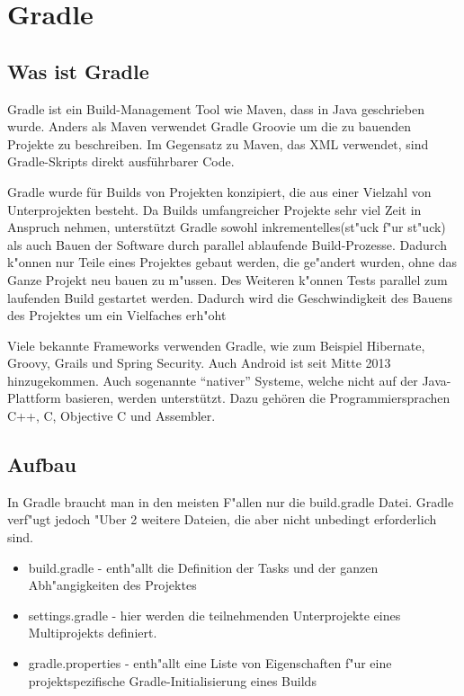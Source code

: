 \section{Gradle}

\subsection{Was ist Gradle}
Gradle ist ein Build-Management Tool wie Maven, dass in Java geschrieben wurde. Anders als Maven verwendet Gradle Groovie um die zu bauenden Projekte zu beschreiben. Im Gegensatz zu Maven, das XML verwendet, sind Gradle-Skripts direkt ausführbarer Code.

Gradle wurde für Builds von Projekten konzipiert, die aus einer Vielzahl von Unterprojekten besteht.
Da Builds umfangreicher Projekte sehr viel Zeit in Anspruch nehmen, unterstützt Gradle sowohl inkrementelles(st"uck f"ur st"uck) als auch Bauen der Software durch parallel ablaufende Build-Prozesse. Dadurch k"onnen nur Teile eines Projektes gebaut werden, die ge"andert wurden, ohne das Ganze Projekt neu bauen zu m"ussen. Des Weiteren k"onnen Tests parallel zum laufenden Build gestartet werden. Dadurch wird die Geschwindigkeit des Bauens des Projektes um ein Vielfaches erh"oht

Viele bekannte Frameworks verwenden Gradle, wie zum Beispiel Hibernate, Groovy, Grails und Spring Security. Auch Android ist seit Mitte 2013 hinzugekommen. Auch sogenannte ``nativer'' Systeme, welche nicht auf der Java-Plattform basieren, werden unterstützt. Dazu gehören die Programmiersprachen C++, C, Objective C und Assembler.

\subsection{Aufbau}
In Gradle braucht man in den meisten F"allen nur die build.gradle Datei. Gradle verf"ugt jedoch "Uber 2 weitere Dateien, die aber nicht unbedingt erforderlich sind.
\begin{itemize}
\item build.gradle - enth"allt die Definition der Tasks und der ganzen Abh"angigkeiten des Projektes
\item settings.gradle - hier werden die teilnehmenden Unterprojekte eines Multiprojekts definiert.
\item gradle.properties - enth"allt eine Liste von Eigenschaften f"ur eine projektspezifische Gradle-Initialisierung eines Builds
\end{itemize}

